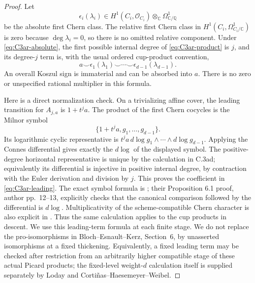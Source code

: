 \begin{proof}
Let
\[
 \epsilon_i(\lambda_i)\in
 H^1(C_i,\mathcal O_{C_i})\otimes_{\mathbb C}
                        \Omega^1_{\mathbb C/\mathbb Q}
\]
be the absolute first Chern class. The relative first Chern class
in $H^1(C_i,\Omega^1_{C_i/\mathbb C})$ is zero because
$\deg\lambda_i=0$, so there is no omitted relative component.
Under \eqref{eq:C3ar-absolute}, the first possible internal degree
of \eqref{eq:C3ar-product} is $j$, and its degree-$j$ term is,
with the usual ordered cup-product convention,
\begin{equation}\label{eq:C3ar-leading}
       a\smile\epsilon_1(\lambda_1)\smile\cdots
                   \smile\epsilon_{d-1}(\lambda_{d-1}).
\end{equation}
An overall Koszul sign is immaterial and can be absorbed into $a$.
There is no zero or unspecified rational multiplier in this formula.

Here is a direct normalization check. On a trivializing affine
cover, the leading transition for $A_{j,a}$ is $1+t^j a$.
The product of the first Chern cocycles is the Milnor symbol
\[
                  \{1+t^j a,g_1,\ldots,g_{d-1}\}.
\]
Its logarithmic cyclic representative is
$t^j a\,d\log g_1\wedge\cdots\wedge d\log g_{d-1}$.
Applying the Connes differential gives exactly the $d\log$ of the
displayed symbol. The positive-degree horizontal representative is
unique by the calculation in C.3ad; equivalently its differential
is injective in positive internal degree, by contraction with the
Euler derivation and division by $j$. This proves the coefficient
in \eqref{eq:C3ar-leading}. The exact symbol formula is
\citet[Lemma 2.2 and Proposition 2.3, author pp.~3--4]{D_BlochEsnaultKerz2014};
their Proposition 6.1 proof, author pp.~12--13, explicitly checks
that the canonical comparison followed by the differential is
$d\log$. Multiplicativity of the scheme-compatible Chern character
is also explicit in
\citet[author pp.~16 and 25]{D_CortinasHaesemeyerWeibel2009}.
Thus the same calculation applies to the cup products in descent.
We use this leading-term formula at each finite stage. We do not
replace the pro-isomorphisms in Bloch--Esnault--Kerz, Section~6,
by unasserted isomorphisms at a fixed thickening. Equivalently, a
fixed leading term may be checked after restriction from an arbitrarily
higher compatible stage of these actual Picard products; the
fixed-level weight-$d$ calculation itself is supplied separately
by Loday and Corti\~nas--Haesemeyer--Weibel.


\end{proof}
